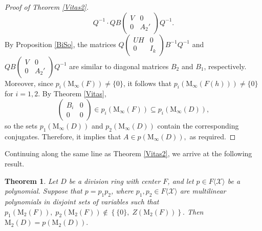 \documentclass[11pt]{article}
\newtheorem{theorem}{Theorem}
\theoremstyle{definition}
\begin{document}
{{{{\begin{proof}[Proof of Theorem {\rm \ref{Vitas2}}]
\[					Q^{-1}
					\cdot
					Q B
					\begin{pmatrix}
						V & 0 \\
						0 & A_2'
					\end{pmatrix}
					Q^{-1}.
					\] By Proposition \ref{BiSo}, the matrices $	Q
					\begin{pmatrix}
						U H & 0 \\
						0 & I_k
					\end{pmatrix}
					B^{-1}
					Q^{-1}$ and $Q B
					\begin{pmatrix}
						V & 0 \\
						0 & A_2'
					\end{pmatrix}
					Q^{-1}$ are similar to diagonal matrices \( B_2 \) and \( B_1 \), respectively. Moreover, since \( p_i(\mathrm{M}_\infty(F)) \neq \{0\} \), it follows that \( p_i(\mathrm{M}_\infty(F(h))) \neq \{0\} \) for \( i = 1,2 \). By Theorem \ref{Vitas},
					\[
					\begin{pmatrix}
						B_i & 0 \\
						0 & 0
					\end{pmatrix}
					\in p_i(\mathrm{M}_\infty(F)) \subseteq p_i(\mathrm{M}_\infty(D)),
					\] so  the sets \( p_1(\mathrm{M}_\infty(D)) \) and \( p_2(\mathrm{M}_\infty(D)) \) contain the corresponding conjugates. Therefore, it implies that $A \in p(\mathrm{M}_\infty(D)),$
					as required.
				\end{proof}
				
				
				Continuing along the same line as Theorem \ref{Vitas2}, we arrive at the following result.
				
				\begin{theorem}\label{Waring1}
					Let \( D \) be a division ring with center \( F \), and let \( p \in F\langle \mathcal{X} \rangle \) be a polynomial. Suppose that \( p = p_1 p_2 \), where \( p_1, p_2 \in F\langle \mathcal{X} \rangle \) are multilinear polynomials in disjoint sets of variables such that
					$p_1(\mathrm{M}_2(F)),\; p_2(\mathrm{M}_2(F)) \notin \left\{ \{0\},\; Z(\mathrm{M}_2(F)) \right\}.$
					Then $\mathrm{M}_2(D) = p(\mathrm{M}_2(D)).$
				\end{theorem}
				
}}}}
\end{document}
